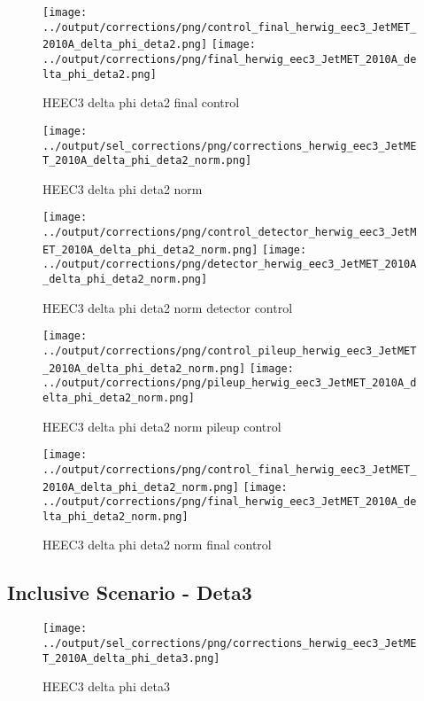 \documentclass[11pt]{book}
\begin{document}
\begin{figure}[ht]
\centering
\texttt{[image: ../output/corrections/png/control\_final\_herwig\_eec3\_JetMET\_2010A\_delta\_phi\_deta2.png]}
\texttt{[image: ../output/corrections/png/final\_herwig\_eec3\_JetMET\_2010A\_delta\_phi\_deta2.png]}
\caption{HEEC3 delta phi deta2 final control}
\label{fig:HEEC3_JetMET_2010A_delta_phi_deta2_final_control}
\end{figure}


\begin{figure}[ht]
\centering
\texttt{[image: ../output/sel\_corrections/png/corrections\_herwig\_eec3\_JetMET\_2010A\_delta\_phi\_deta2\_norm.png]}
\caption{HEEC3 delta phi deta2 norm}
\label{fig:HEEC3_JetMET_2010A_delta_phi_deta2_norm}
\end{figure}

\begin{figure}[ht]
\centering
\texttt{[image: ../output/corrections/png/control\_detector\_herwig\_eec3\_JetMET\_2010A\_delta\_phi\_deta2\_norm.png]}
\texttt{[image: ../output/corrections/png/detector\_herwig\_eec3\_JetMET\_2010A\_delta\_phi\_deta2\_norm.png]}
\caption{HEEC3 delta phi deta2 norm detector control}
\label{fig:HEEC3_JetMET_2010A_delta_phi_deta2_norm_detector_control}
\end{figure}

\begin{figure}[ht]
\centering
\texttt{[image: ../output/corrections/png/control\_pileup\_herwig\_eec3\_JetMET\_2010A\_delta\_phi\_deta2\_norm.png]}
\texttt{[image: ../output/corrections/png/pileup\_herwig\_eec3\_JetMET\_2010A\_delta\_phi\_deta2\_norm.png]}
\caption{HEEC3 delta phi deta2 norm pileup control}
\label{fig:HEEC3_JetMET_2010A_delta_phi_deta2_norm_pileup_control}
\end{figure}


\begin{figure}[ht]
\centering
\texttt{[image: ../output/corrections/png/control\_final\_herwig\_eec3\_JetMET\_2010A\_delta\_phi\_deta2\_norm.png]}
\texttt{[image: ../output/corrections/png/final\_herwig\_eec3\_JetMET\_2010A\_delta\_phi\_deta2\_norm.png]}
\caption{HEEC3 delta phi deta2 norm final control}
\label{fig:HEEC3_JetMET_2010A_delta_phi_deta2_norm_final_control}
\end{figure}


\clearpage
\subsection{Inclusive Scenario - Deta3}
\begin{figure}[ht]
\centering
\texttt{[image: ../output/sel\_corrections/png/corrections\_herwig\_eec3\_JetMET\_2010A\_delta\_phi\_deta3.png]}
\caption{HEEC3 delta phi deta3}
\label{fig:HEEC3_JetMET_2010A_delta_phi_deta3}
\end{figure}
\end{document}
